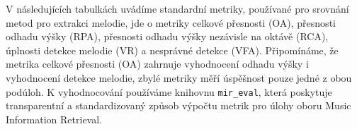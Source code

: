 V následujících tabulkách uvádíme standardní metriky, používané pro srovnání metod pro extrakci melodie, jde o metriky celkové přesnosti (OA), přesnosti odhadu výšky (RPA), přesnosti odhadu výšky nezávisle na oktávě (RCA), úplnosti detekce melodie (VR) a nesprávné detekce (VFA). Připomínáme, že metrika celkové přesnosti (OA) zahrnuje vyhodnocení odhadu výšky i vyhodnocení detekce melodie, zbylé metriky měří úspěšnost pouze jedné z obou podúloh. K vyhodnocování používáme knihovnu \texttt{mir\_eval}, která poskytuje transparentní a standardizovaný způsob výpočtu metrik pro úlohy oboru Music Information Retrieval.

\begin{table}[p]
\centering
{}%
\caption{Výsledky celkové přesnosti (Overall Accuracy). Vyznačené výsledky jsou pro daný dataset nejvyšší z porovnávaných v rámci daného datasetu.}\label{tab:vysledky_OA}
\end{table}

